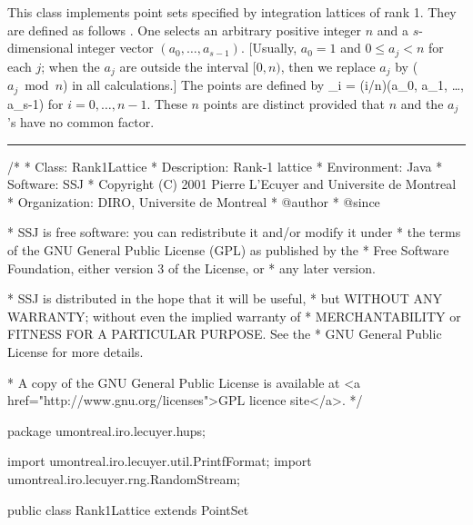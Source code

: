 
This class implements point sets specified by integration
lattices of rank 1. They are defined as follows \cite{vSLO94a}.
One selects an arbitrary positive integer $n$ and a $s$-dimensional
integer vector $(a_0,\dots,a_{s-1})$.
[Usually, $a_0=1$ and $0 \le a_j < n$ for each $j$;
when the $a_j$ are outside the interval $[0,n)$, then we replace  $a_j$ by
($a_j \bmod n$) in all calculations.] The points are defined by
\eq
  _i = (i/n)(a_0, a_1, \ldots, a_{s-1}) 
\endeq
for $i=0,\dots,n-1$.
These $n$ points are distinct provided that $n$ and the $a_j$'s have
no common factor.


\bigskip\hrule\bigskip

\begin{code}
\begin{hide}
/*
 * Class:        Rank1Lattice
 * Description:  Rank-1 lattice
 * Environment:  Java
 * Software:     SSJ
 * Copyright (C) 2001  Pierre L'Ecuyer and Universite de Montreal
 * Organization: DIRO, Universite de Montreal
 * @author
 * @since

 * SSJ is free software: you can redistribute it and/or modify it under
 * the terms of the GNU General Public License (GPL) as published by the
 * Free Software Foundation, either version 3 of the License, or
 * any later version.

 * SSJ is distributed in the hope that it will be useful,
 * but WITHOUT ANY WARRANTY; without even the implied warranty of
 * MERCHANTABILITY or FITNESS FOR A PARTICULAR PURPOSE.  See the
 * GNU General Public License for more details.

 * A copy of the GNU General Public License is available at
   <a href="http://www.gnu.org/licenses">GPL licence site</a>.
 */
\end{hide}
package umontreal.iro.lecuyer.hups;\begin{hide}
import umontreal.iro.lecuyer.util.PrintfFormat;
import umontreal.iro.lecuyer.rng.RandomStream;
\end{hide}

public class Rank1Lattice extends PointSet \begin{hide} {

   protected int[] genAs;          // Lattice generator:  a[i]
   protected double[] v;           // Lattice vector:  v[i] = a[i]/n
   protected double normFactor;    // 1/n.
   protected double[] shift;       // Random shift, initially null.

   private void initN (int n) {
      numPoints = n;
      normFactor = 1.0 / (double) n;
      for (int j = 0; j < dim; j++) {
         int amod = (genAs[j] %
         v[j] = normFactor * amod;
      }
   }
\end{hide}
\end{code}

